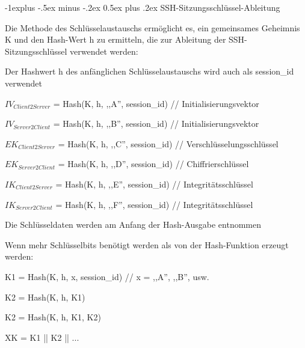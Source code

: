 \documentclass[a4paper]{article}
\makeatletter
\renewcommand{\subsection}{\@startsection{subsection}{2}{0mm}%
 {-1explus -.5ex minus -.2ex}%
 {0.5ex plus .2ex}%
 {\normalfont\normalsize\bfseries}}
\makeatother
\begin{document}
\begin{multicols}{3}
      \subsection{SSH-Sitzungsschlüssel-Ableitung}
      \begin{itemize*}
            \item Die Methode des Schlüsselaustauschs ermöglicht es, ein gemeinsames Geheimnis K und den Hash-Wert h zu ermitteln, die zur Ableitung der SSH-Sitzungsschlüssel verwendet werden:
            \begin{itemize*}
                  \item Der Hashwert h des anfänglichen Schlüsselaustauschs wird auch als session\_id verwendet
                  \item $IV_{Client2Server}$ = Hash(K, h, ,,A'', session\_id) // Initialisierungsvektor
                  \item $IV_{Server2Client}$ = Hash(K, h, ,,B'', session\_id) // Initialisierungsvektor
                  \item $EK_{Client2Server}$ = Hash(K, h, ,,C'', session\_id) // Verschlüsselungsschlüssel
                  \item $EK_{Server2Client}$ = Hash(K, h, ,,D'', session\_id) // Chiffrierschlüssel
                  \item $IK_{Client2Server}$ = Hash(K, h, ,,E'', session\_id) // Integritätsschlüssel
                  \item $IK_{Server2Client}$ = Hash(K, h, ,,F'', session\_id) // Integritätsschlüssel
            \end{itemize*}
            \item Die Schlüsseldaten werden am Anfang der Hash-Ausgabe entnommen
            \item Wenn mehr Schlüsselbits benötigt werden als von der Hash-Funktion erzeugt werden:
            \begin{itemize*}
                  \item K1 = Hash(K, h, x, session\_id) // x = ,,A'', ,,B'', usw.
                  \item K2 = Hash(K, h, K1)
                  \item K2 = Hash(K, h, K1, K2)
                  \item XK = K1 || K2 || ...
            \end{itemize*}
      \end{itemize*}


\end{multicols}
\end{document}
